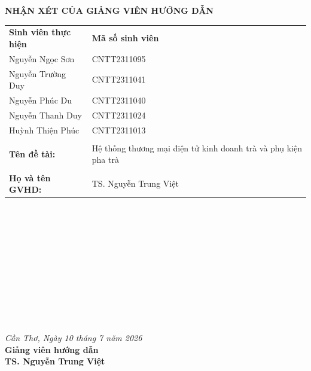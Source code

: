 \newpage
{}
{}

\begin{center}
    \textbf{\Large NHẬN XÉT CỦA GIẢNG VIÊN HƯỚNG DẪN}
\end{center}

\vspace{1cm}

\begin{table}[h]
\begin{tabular}{ll}
\textbf{Sinh viên thực hiện} & \textbf{Mã số sinh viên} \\
Nguyễn Ngọc Sơn              & CNTT2311095              \\
Nguyễn Trường Duy            & CNTT2311041              \\
Nguyễn Phúc Du               & CNTT2311040              \\
Nguyễn Thanh Duy             & CNTT2311024              \\
Huỳnh Thiện Phúc             & CNTT2311013              \\
                            &                          \\
\textbf{Tên đề tài:}       & Hệ thống thương mại điện tử kinh doanh trà và phụ kiện pha trà \\
                            &                          \\
\textbf{Họ và tên GVHD:}   & TS. Nguyễn Trung Việt     \\
\end{tabular}
\end{table}

\vspace{0.5cm}
\noindent\makebox[\linewidth]{\dotfill} \\
\noindent\makebox[\linewidth]{\dotfill} \\
\noindent\makebox[\linewidth]{\dotfill} \\
\noindent\makebox[\linewidth]{\dotfill} \\
\noindent\makebox[\linewidth]{\dotfill} \\
\noindent\makebox[\linewidth]{\dotfill} \\
\noindent\makebox[\linewidth]{\dotfill} \\
\noindent\makebox[\linewidth]{\dotfill} \\
\noindent\makebox[\linewidth]{\dotfill} \\
\noindent\makebox[\linewidth]{\dotfill} \\
\noindent\makebox[\linewidth]{\dotfill}

\vspace{1cm}

\begin{flushright}
    \textit{Cần Thơ, Ngày 10 tháng 7 năm 2026} \\
    \textbf{Giảng viên hướng dẫn} \\
    \vspace{2cm}
    \textbf{TS. Nguyễn Trung Việt}
\end{flushright}